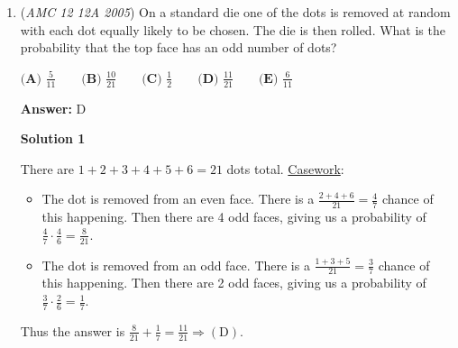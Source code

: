 \begin{enumerate}
 



\textbf{Solution 2}

Let the terms in the arithmetic sequence be $a$, $a + d$, $a + 2d$, $a + 3d$, and $a + 4d$. We seek the middle term $a + 2d$.

 These five terms are $A + B$, $B + C$, $C + D$, $D + E$, and $E + A$, in some order. The numbers $A$, $B$, $C$, $D$, and $E$ are equal to 3, 5, 6, 7, and 9, in some order, so
 \[A + B + C + D + E = 3 + 5 + 6 + 7 + 9 = 30.\]Hence, the sum of the five terms is
 \[(A + B) + (B + C) + (C + D) + (D + E) + (E + A) = 2A + 2B + 2C + 2D + 2E = 60.\]But adding all five numbers, we also get $a + (a + d) + (a + 2d) + (a + 3d) + (a + 4d) = 5a + 10d$, so
 \[5a + 10d = 60.\]Dividing both sides by 5, we get $a + 2d = \boxed{12}$, which is the middle term. The answer is (D).

 



\textbf{Solution 3}

Not too bad with some logic and the awesome guess and check. Let $A=6$. Then let $B=7,E=5$ and $C=3,D=9$. Our arithmetic sequence is $10,11,12,13,14$ so our answer is $12 \Longrightarrow \mathrm{(D)}$.

 Solution by franzliszt

 


	\item (\textit{AMC 12 12A 2005}) On a standard die one of the dots is removed at random with each dot equally likely to be chosen. The die is then rolled. What is the probability that the top face has an odd number of dots?


 $\textbf{(A) } \frac{5}{11} \qquad \textbf{(B) } \frac{10}{21} \qquad \textbf{(C) } \frac{1}{2} \qquad \textbf{(D) } \frac{11}{21} \qquad \textbf{(E) } \frac{6}{11}$

 \textbf{Answer: }D



\textbf{Solution 1}

There are $1 + 2 + 3 + 4 + 5 + 6 = 21$ dots total. \href{https://artofproblemsolving.com/wiki/index.php?title=Casework}{Casework}:

 
            \begin{itemize}
        \item The dot is removed from an even face. There is a $\frac{2+4+6}{21} = \frac{4}{7}$ chance of this happening. Then there are 4 odd faces, giving us a probability of $\frac 47 \cdot \frac 46 = \frac{8}{21}$.
        \item The dot is removed from an odd face. There is a $\frac{1+3+5}{21} = \frac{3}{7}$ chance of this happening. Then there are 2 odd faces, giving us a probability of $\frac 37 \cdot \frac 26 = \frac{1}{7}$.
            \end{itemize}
            Thus the answer is $\frac 8{21} + \frac 17 = \frac{11}{21} \Longrightarrow \mathrm{(D)}$.


\end{enumerate}
